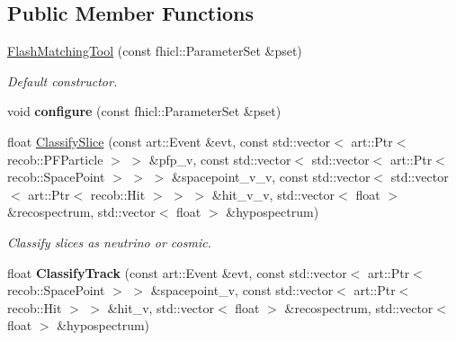 \subsection*{Public Member Functions}
\begin{DoxyCompactItemize}
\item 
\hyperlink{classflashmatch_1_1FlashMatchingTool_a8c6b08ba5404a69ad5fc984eaf8a1eba}{Flash\+Matching\+Tool} (const fhicl\+::\+Parameter\+Set \&pset)
\begin{DoxyCompactList}\small\item\em Default constructor. \end{DoxyCompactList}\item 
void {\bfseries configure} (const fhicl\+::\+Parameter\+Set \&pset)\hypertarget{classflashmatch_1_1FlashMatchingTool_a58e2b1ea201c0b8429e1111380b0a108}{}\label{classflashmatch_1_1FlashMatchingTool_a58e2b1ea201c0b8429e1111380b0a108}

\item 
float \hyperlink{classflashmatch_1_1FlashMatchingTool_aed79e484b39c5d02e84714b45c68bf7f}{Classify\+Slice} (const art\+::\+Event \&evt, const std\+::vector$<$ art\+::\+Ptr$<$ recob\+::\+P\+F\+Particle $>$ $>$ \&pfp\+\_\+v, const std\+::vector$<$ std\+::vector$<$ art\+::\+Ptr$<$ recob\+::\+Space\+Point $>$ $>$ $>$ \&spacepoint\+\_\+v\+\_\+v, const std\+::vector$<$ std\+::vector$<$ art\+::\+Ptr$<$ recob\+::\+Hit $>$ $>$ $>$ \&hit\+\_\+v\+\_\+v, std\+::vector$<$ float $>$ \&recospectrum, std\+::vector$<$ float $>$ \&hypospectrum)
\begin{DoxyCompactList}\small\item\em Classify slices as neutrino or cosmic. \end{DoxyCompactList}\item 
float {\bfseries Classify\+Track} (const art\+::\+Event \&evt, const std\+::vector$<$ art\+::\+Ptr$<$ recob\+::\+Space\+Point $>$ $>$ \&spacepoint\+\_\+v, const std\+::vector$<$ art\+::\+Ptr$<$ recob\+::\+Hit $>$ $>$ \&hit\+\_\+v, std\+::vector$<$ float $>$ \&recospectrum, std\+::vector$<$ float $>$ \&hypospectrum)\hypertarget{classflashmatch_1_1FlashMatchingTool_a576990a409d28ed7526963195df7e55a}{}\label{classflashmatch_1_1FlashMatchingTool_a576990a409d28ed7526963195df7e55a}

\end{DoxyCompactItemize}
